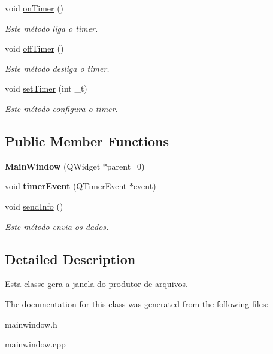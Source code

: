\begin{DoxyCompactItemize}
\mbox{\label{class_main_window_a02c758341d26e773788210455fffd774}} 
void \mbox{\hyperlink{class_main_window_a02c758341d26e773788210455fffd774}{on\+Timer}} ()
\begin{DoxyCompactList}\small\item\em Este método liga o timer. \end{DoxyCompactList}\item 
\mbox{\label{class_main_window_a7e7c230ecf7df1554f8a1ac68976253f}} 
void \mbox{\hyperlink{class_main_window_a7e7c230ecf7df1554f8a1ac68976253f}{off\+Timer}} ()
\begin{DoxyCompactList}\small\item\em Este método desliga o timer. \end{DoxyCompactList}\item 
\mbox{\label{class_main_window_ab5db2dcd9b9592285a18fa7d19256e6a}} 
void \mbox{\hyperlink{class_main_window_ab5db2dcd9b9592285a18fa7d19256e6a}{set\+Timer}} (int \+\_\+t)
\begin{DoxyCompactList}\small\item\em Este método configura o timer. \end{DoxyCompactList}\end{DoxyCompactItemize}
\subsection*{Public Member Functions}
\begin{DoxyCompactItemize}
\item 
\mbox{\label{class_main_window_a8b244be8b7b7db1b08de2a2acb9409db}} 
{\bfseries Main\+Window} (Q\+Widget $\ast$parent=0)
\item 
\mbox{\label{class_main_window_aaa425b1554af3c1f58cc70b4815082ae}} 
void {\bfseries timer\+Event} (Q\+Timer\+Event $\ast$event)
\item 
\mbox{\label{class_main_window_a80d9c71f712c71b7f5e115afcfba95e6}} 
void \mbox{\hyperlink{class_main_window_a80d9c71f712c71b7f5e115afcfba95e6}{send\+Info}} ()
\begin{DoxyCompactList}\small\item\em Este método envia os dados. \end{DoxyCompactList}\end{DoxyCompactItemize}


\subsection{Detailed Description}
Esta classe gera a janela do produtor de arquivos. 

The documentation for this class was generated from the following files\+:\begin{DoxyCompactItemize}
\item 
mainwindow.\+h\item 
mainwindow.\+cpp\end{DoxyCompactItemize}

